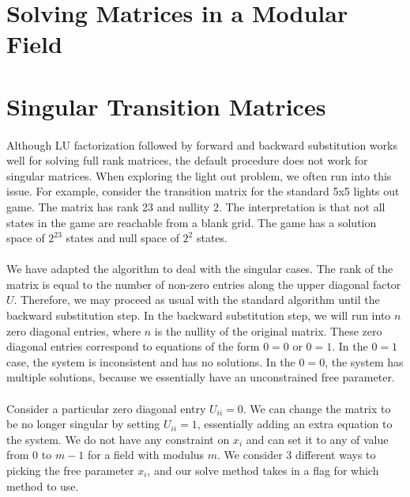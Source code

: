 \documentclass[11pt]{article}
\begin{document}
\section*{Solving Matrices in a Modular Field}


\section*{Singular Transition Matrices}
\paragraph{} Although LU factorization followed by forward and backward substitution works well for solving full rank matrices, the default procedure does not work for singular matrices.  When exploring the light out problem, we often run into this issue.  For example, consider the transition matrix for the standard 5x5 lights out game.  The matrix has rank 23 and nullity 2.  The interpretation is that not all states in the game are reachable from a blank grid.  The game has a solution space of $2^{23}$ states and null space of $2^2$ states.


\paragraph{} We have adapted the algorithm to deal with the singular cases.  The rank of the matrix is equal to the number of non-zero entries along the upper diagonal factor $U$.  Therefore, we may proceed as usual with the standard algorithm until the backward substitution step.  In the backward substitution step, we will run into $n$ zero diagonal entries, where $n$ is the nullity of the original matrix.  These zero diagonal entries correspond to equations of the form $0 = 0$ or $0 = 1$.  In the $0 = 1$ case, the system is inconsistent and has no solutions.  In the $0 = 0$, the system has multiple solutions, because we essentially have an unconstrained free parameter.


\paragraph{} Consider a particular zero diagonal entry $U_{ii} = 0$.  We can change the matrix to be no longer singular by setting $U_{ii} = 1$, essentially adding an extra equation to the system.  We do not have any constraint on $x_i$ and can set it to any of value from 0 to $m - 1$ for a field with modulus $m$.  We consider 3 different ways to picking the free parameter $x_i$, and our solve method takes in a flag for which method to use.
\end{document}
